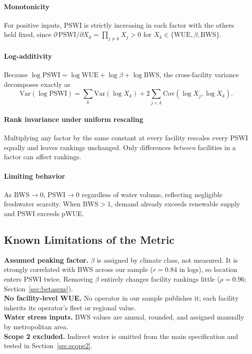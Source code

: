 \documentclass[conference,10pt]{IEEEtran}
\begin{document}
\paragraph{Monotonicity}
For positive inputs, PSWI is strictly increasing in each factor with the
others held fixed, since
$\partial\,\textrm{PSWI}/\partial X_k = \prod_{j\neq k} X_j > 0$ for
$X_k \in \{\textrm{WUE}, \beta, \textrm{BWS}\}$.

\paragraph{Log-additivity}
Because $\log\textrm{PSWI} = \log\textrm{WUE} + \log\beta + \log\textrm{BWS}$,
the cross-facility variance decomposes exactly as
\begin{equation}
\textrm{Var}(\log\textrm{PSWI}) =
\sum_k \textrm{Var}(\log X_k) + 2 \sum_{j<k} \textrm{Cov}(\log X_j, \log X_k).
\label{eq:vardecomp}
\end{equation}

\paragraph{Rank invariance under uniform rescaling}
Multiplying any factor by the same constant at every facility rescales every
PSWI equally and leaves rankings unchanged. Only differences \emph{between}
facilities in a factor can affect rankings.

\paragraph{Limiting behavior}
As $\textrm{BWS} \to 0$, $\textrm{PSWI} \to 0$ regardless of water volume,
reflecting negligible freshwater scarcity. When $\textrm{BWS} > 1$, demand
already exceeds renewable supply and PSWI exceeds pWUE.

\subsection{Known Limitations of the Metric}

\begin{tcolorbox}[colback=yellow!8, colframe=yellow!50!black,
                  title=Box 1: Known limitations in this application]
\small
\textbf{Assumed peaking factor.} $\beta$ is assigned by climate class, not
measured. It is strongly correlated with BWS across our sample ($r = 0.84$
in logs), so location enters PSWI twice. Removing $\beta$ entirely changes
facility rankings little ($\rho = 0.96$; Section~\ref{sec:betasens}). \\[2pt]
\textbf{No facility-level WUE.} No operator in our sample publishes it;
each facility inherits its operator's fleet or regional value. \\[2pt]
\textbf{Water stress inputs.} BWS values are annual, rounded, and assigned
manually by metropolitan area. \\[2pt]
\textbf{Scope 2 excluded.} Indirect water is omitted from the main
specification and tested in Section~\ref{sec:scope2}.
\end{tcolorbox}
\end{document}
